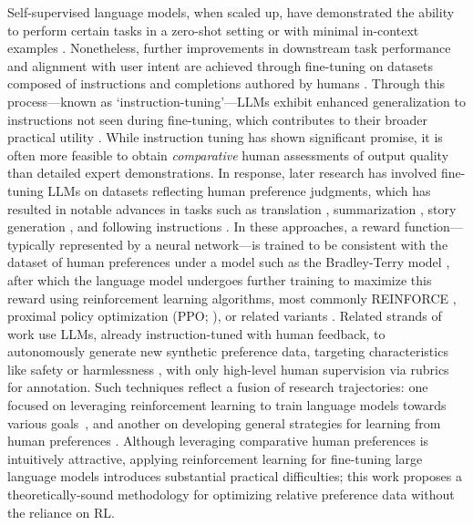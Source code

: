 Self-supervised language models, when scaled up, have demonstrated the ability to perform certain tasks in a zero-shot setting \citep{radford2019language} or with minimal in-context examples \citep{gpt3,megatron,chowdhery2022palm}. Nonetheless, further improvements in downstream task performance and alignment with user intent are achieved through fine-tuning on datasets composed of instructions and completions authored by humans \citep{mishra-etal-2022-cross,sanh2022multitask,chung2022scaling,thoppilan2022lamda}. Through this process—known as `instruction-tuning'—LLMs exhibit enhanced generalization to instructions not seen during fine-tuning, which contributes to their broader practical utility \citep{chung2022scaling}. While instruction tuning has shown significant promise, it is often more feasible to obtain \textit{comparative} human assessments of output quality than detailed expert demonstrations. In response, later research has involved fine-tuning LLMs on datasets reflecting human preference judgments, which has resulted in notable advances in tasks such as translation \citep{kreutzer-etal-2018-reliability}, summarization \citep{stiennon2022learning,ziegler2020finetuning}, story generation \citep{ziegler2020finetuning}, and following instructions \citep{ouyang2022training,ramamurthy2023is}. In these approaches, a reward function—typically represented by a neural network—is trained to be consistent with the dataset of human preferences under a model such as the Bradley-Terry model \citep{bradley1952rankanalysis}, after which the language model undergoes further training to maximize this reward using reinforcement learning algorithms, most commonly REINFORCE \citep{williams1992reinforce}, proximal policy optimization (PPO; \cite{schulman2017proximal}), or related variants \citep{ramamurthy2023is}. Related strands of work use LLMs, already instruction-tuned with human feedback, to autonomously generate new synthetic preference data, targeting characteristics like safety or harmlessness \citep{bai2022constitutional}, with only high-level human supervision via rubrics for annotation. Such techniques reflect a fusion of research trajectories: one focused on leveraging reinforcement learning to train language models towards various goals~\citep{Ranzato2015SequenceLT,paulus2018a,wu2018learning}, and another on developing general strategies for learning from human preferences \citep{christiano2017deep,kupcsik2018learning}. Although leveraging comparative human preferences is intuitively attractive, applying reinforcement learning for fine-tuning large language models introduces substantial practical difficulties; this work proposes a theoretically-sound methodology for optimizing relative preference data without the reliance on RL.

